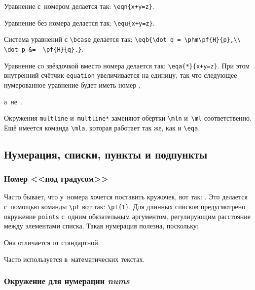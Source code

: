 \documentclass[a4paper]{article}
\begin{document}
\begin{items}{-1}
\item Уравнение с~номером 
делается так: \verb'\eqn{x+y=z}'.

\item Уравнение без номера 
делается так: \verb'\equ{x+y=z}'.

\item Система уравнений с \verb"\bcase" 
делается так: \verb'\eqb{\dot q = \phm\pf{H}{p},\\ \dot p &= -\pf{H}{q}.}'.

\item Уравнение со звёздочкой вместо номера 
делается так: \verb'\eqa{*}{x+y=z}'.
При этом внутренний счётчик \verb'equation' увеличивается на единицу, так что следующее нумерованное
уравнение  будет иметь номер ,\addtocounter{equation}{-1} а~не~.
\addtocounter{equation}{1}

\item Окружения \verb'multline' и~\verb'multline*' заменяют обёртки \verb'\mln' и~\verb'\ml'
соответственно. Ещё имеется команда \verb'\mla', которая работает так же, как и \verb'\eqa'.
\end{items}

\subsection{Нумерация, списки, пункты и подпункты}

\subsubsection{Номер <<под градусом>>}
Часто бывает, что у~номера хочется поставить кружочек, вот так: . Это делается с~помощью
команды \verb'\pt' вот так: \verb'\pt{1}'. Для длинных списков предусмотрено окружение \verb'points'
с~одним обязательным аргументом, регулирующим расстояние между элементами списка.
Такая нумерация полезна, поскольку:
\begin{points}{-3}
\item Она отличается от стандартной.
\item Часто используется в~математических текстах.
\end{points}

\subsubsection{Окружение для нумерации \emph{nums}}
\end{document}
